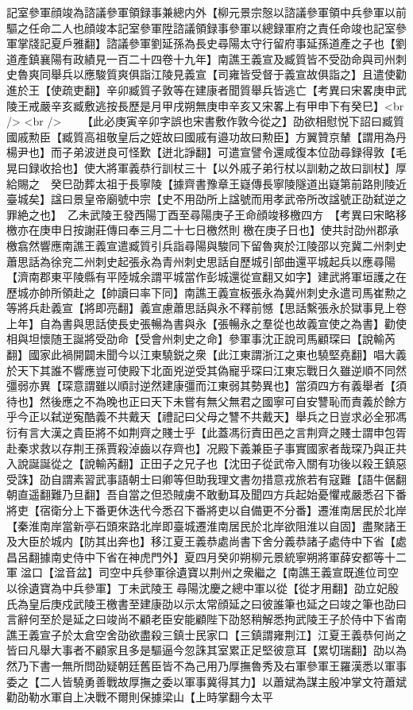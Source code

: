 記室參軍顔竣為諮議參軍領録事兼總内外【柳元景宗慤以諮議參軍領中兵參軍以前驅之任命二人也顔竣本記室參軍陞諮議領録事參軍以總録軍府之責任命竣也記室參軍掌牋記夏戶雅翻】諮議參軍劉延孫為長史尋陽太守行留府事延孫道產之子也【劉道產鎮襄陽有政績見一百二十四卷十九年】南譙王義宣及臧質皆不受劭命與司州刺史魯爽同舉兵以應駿質爽俱詣江陵見義宣【司雍皆受督于義宣故俱詣之】且遣使勸進於王【使疏吏翻】辛卯臧質子敦等在建康者聞質舉兵皆逃亡【考異曰宋畧庚申武陵王戒嚴辛亥臧敷逃按長歷是月甲戌朔無庚申辛亥又宋畧上有甲申下有癸巳】<br />
<br />
　　【此必庚寅辛卯字誤也宋書敷作敦今從之】劭欲相慰悦下詔曰臧質國戚勲臣【臧質高祖敬皇后之姪故曰國戚有邉功故曰勲臣】方翼贊京輦【謂用為丹楊尹也】而子弟波迸良可怪歎【迸北諍翻】可遣宣譬令還咸復本位劭尋録得敦【毛晃曰録收拾也】使大將軍義恭行訓杖三十【以外戚子弟行杖以訓勅之故曰訓杖】厚給賜之　癸巳劭葬太祖于長寧陵【據齊書豫章王嶷傳長寧陵隧道出嶷第前路則陵近臺城矣】諡曰景皇帝廟號中宗【史不用劭所上諡號而用孝武帝所改諡號正劭弑逆之罪絶之也】　乙未武陵王發西陽丁酉至尋陽庚子王命顔竣移檄四方　【考異曰宋略移檄亦在庚申日按謝莊傳曰奉三月二十七日檄然則檄在庚子日也】使共討劭州郡承檄翕然響應南譙王義宣遣臧質引兵詣尋陽與駿同下留魯爽於江陵邵以兖冀二州刺史蕭思話為徐兖二州刺史起張永為青州刺史思話自歷城引部曲還平城起兵以應尋陽【濟南郡東平陵縣有平陸城余謂平城當作彭城還從宣翻又如字】建武將軍垣護之在歷城亦帥所領赴之【帥讀曰率下同】南譙王義宣板張永為冀州刺史永遣司馬崔勲之等將兵赴義宣【將即亮翻】義宣慮蕭思話與永不釋前憾【思話繫張永於獄事見上卷上年】自為書與思話使長史張暢為書與永【張暢永之羣從也故義宣使之為書】勸使相與坦懷随王誕將受劭命【受會州刺史之命】參軍事沈正說司馬顧琛曰【說輸芮翻】國家此禍開闢未聞今以江東驍鋭之衆【此江東謂浙江之東也驍堅堯翻】唱大義於天下其誰不響應豈可使殿下北面兇逆受其偽寵乎琛曰江東忘戰日久雖逆順不同然彊弱亦異【琛意謂雖以順討逆然建康彊而江東弱其勢異也】當須四方有義舉者【須待也】然後應之不為晚也正曰天下未嘗有無父無君之國寧可自安讐恥而責義於餘方乎今正以弑逆寃酷義不共戴天【禮記曰父母之讐不共戴天】舉兵之日豈求必全邪馮衍有言大漢之貴臣將不如荆齊之賤士乎【此蓋馮衍責田邑之言荆齊之賤士謂申包胥赴秦求救以存荆王孫賈殺淖齒以存齊也】况殿下義兼臣子事實國家者哉琛乃與正共入說誕誕從之【說輸芮翻】正田子之兄子也【沈田子從武帝入關有功後以殺王鎮惡受誅】劭自謂素習武事語朝士曰卿等但助我理文書勿措意戎旅若有寇難【語牛倨翻朝直遥翻難乃旦翻】吾自當之但恐賊虜不敢動耳及聞四方兵起始憂懼戒嚴悉召下番將吏【宿衛分上下番更休迭代今悉召下番將吏以自備更不分番】遷淮南居民於北岸【秦淮南岸當新亭石頭來路北岸即臺城遷淮南居民於北岸欲阻淮以自固】盡聚諸王及大臣於城内【防其出奔也】移江夏王義恭處尚書下舍分義恭諸子處侍中下省【處昌呂翻據南史侍中下省在神虎門外】夏四月癸卯朔柳元景統寧朔將軍薛安都等十二軍湓口【湓音盆】司空中兵參軍徐遺寶以荆州之衆繼之【南譙王義宣既進位司空以徐遺寶為中兵參軍】丁未武陵王尋陽沈慶之總中軍以從【從才用翻】劭立妃殷氏為皇后庚戍武陵王檄書至建康劭以示太常顔延之曰彼誰筆也延之曰竣之筆也劭曰言辭何至於是延之曰竣尚不顧老臣安能顧陛下劭怒稍解悉拘武陵王子於侍中下省南譙王義宣子於太倉空舍劭欲盡殺三鎮士民家口【三鎮謂雍荆江】江夏王義恭何尚之皆曰凡舉大事者不顧家且多是驅逼今忽誅其室累正足堅彼意耳【累切瑞翻】劭以為然乃下書一無所問劭疑朝廷舊臣皆不為己用乃厚撫魯秀及右軍參軍王羅漢悉以軍事委之【二人皆驍勇善戰故厚撫之委以軍事冀得其力】以蕭斌為謀主殷冲掌文符蕭斌勸劭勒水軍自上决戰不爾則保據梁山【上時掌翻今太平